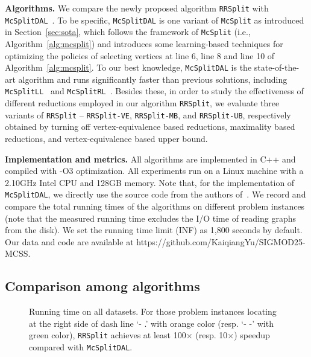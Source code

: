 \smallskip
\noindent\textbf{Algorithms.} We compare the newly proposed algorithm \texttt{RRSplit} with \texttt{McSplitDAL}~\cite{liu2023hybrid}. To be specific, \texttt{McSplitDAL} is one variant of \texttt{McSplit} as introduced in Section~\ref{sec:sota}, which follows the framework of \texttt{McSplit} (i.e., Algorithm~\ref{alg:mcsplit}) and introduces some learning-based techniques for optimizing the policies of selecting vertices at line 6, line 8 and line 10 of Algorithm~\ref{alg:mcsplit}. To our best knowledge, \texttt{McSplitDAL} is the state-of-the-art algorithm and runs significantly faster than previous solutions, including \texttt{McSplitLL}~\cite{zhoustrengthened} and \texttt{McSplitRL}~\cite{liu2023hybrid}. Besides these, in order to study the effectiveness of different reductions employed in our algorithm \texttt{RRSplit}, we evaluate three variants of  \texttt{RRSplit} --  
{\YuiR \texttt{RRSplit-VE}, \texttt{RRSplit-MB}, and \texttt{RRSplit-UB}, respectively obtained by turning off vertex-equivalence based reductions, maximality based reductions,  and  vertex-equivalence based upper bound}. 


\smallskip
\noindent\textbf{Implementation and metrics.} All algorithms are implemented in C++ and compiled with -O3 optimization. All experiments run on a Linux machine with a 2.10GHz Intel CPU and 128GB memory. Note that, for the implementation of \texttt{McSplitDAL}, we directly use the source code from the authors of~\cite{liu2023hybrid}. We record and compare the total running times of the algorithms on different problem instances (note that the measured running time excludes the I/O time of reading graphs from the disk). We set the running time limit (INF) as 1,800 seconds by default. Our data and code are available at https://github.com/KaiqiangYu/SIGMOD25-MCSS. 

\subsection{Comparison among algorithms}

\begin{figure}[]
        \vspace{-0.15in}
	\caption{Running time on all datasets. {\Yui For those problem instances locating at the right side of dash line `- .' with orange color (resp. `- -' with green color),  \texttt{RRSplit} achieves at least 100$\times$ (resp. 10$\times$) speedup compared with \texttt{McSplitDAL}.}}
	\label{fig:all_datasets_T}
\end{figure}

